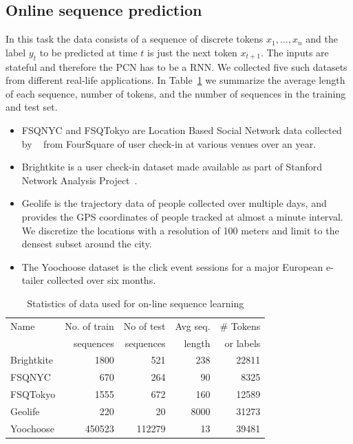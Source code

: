 \documentclass[letterpaper]{article} %
\begin{document}
\subsection{Online sequence prediction}
\label{sec-expt-online}
In this task the data consists of a sequence of discrete tokens $x_1,\ldots,x_n$ and the label $y_t$ to be predicted at time $t$  is just the next token $x_{t+1}$.  The inputs are stateful and therefore the PCN has to be a RNN.
We collected five such datasets from different real-life applications. In Table~\ref{sequence-data} we summarize the average length of each sequence, number of tokens, and the number of sequences in the training and test set.
\begin{itemize}
\item
FSQNYC and FSQTokyo are Location Based Social Network data collected by ~\cite{yang2014} from FourSquare of user check-in at various venues over an year.

\item Brightkite \cite{ChoMyLes11} is a user check-in dataset made available as part of Stanford Network Analysis Project~\cite{snapnets}.

\item
Geolife \cite{geolife09} is the trajectory data of people collected over multiple days, and provides the GPS coordinates of people tracked at almost a minute interval. We discretize the locations with a resolution of 100 meters and limit to the densest subset around the city.
\item
The Yoochoose dataset \cite{Ben-Shimon:2015:RCY:2792838.2798723} is the click event sessions for a major European e-tailer collected over six months.

\end{itemize}

\begin{table}
\begin{center}
\begin{tabular}{|l|r|r|r|r|} \hline
Name & No. of train & No of test & Avg seq. & \# Tokens \\
         &  sequences & sequences & length &  or labels  \\ \hline
Brightkite & 1800  & 521  & 238  &  22811 \\
FSQNYC & 670  &  264  & 90  &  8325 \\
FSQTokyo & 1555  & 672  & 160  &  12589 \\
Geolife & 220  & 20  & 8000 &   31273\\
Yoochoose &  450523 & 112279  & 13 &   39481\\ \hline
\end{tabular}
\end{center}
\caption{\label{sequence-data} Statistics of data used for on-line sequence learning}
\end{table}
\end{document}
